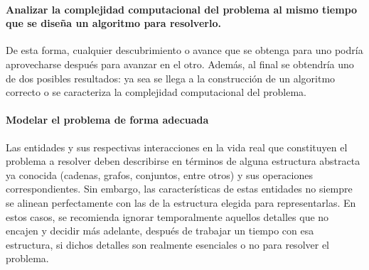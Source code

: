 \paragraph*{Analizar la complejidad computacional del problema al mismo tiempo que se diseña un algoritmo para resolverlo.}{
  De esta forma, cualquier descubrimiento o avance que se obtenga para uno podría aprovecharse después para avanzar en el otro.
  Además, al final se obtendría uno de dos posibles resultados: ya sea se llega a la construcción de un algoritmo correcto o se caracteriza la complejidad computacional del problema.
}

\paragraph*{Modelar el problema de forma adecuada}{
  Las entidades y sus respectivas interacciones en la vida real que constituyen el problema a resolver deben describirse en términos de alguna estructura abstracta ya conocida (cadenas, grafos, conjuntos, entre otros) y sus operaciones correspondientes.
  Sin embargo, las características de estas entidades no siempre se alinean perfectamente con las de la estructura elegida para representarlas.
  En estos casos, se recomienda ignorar temporalmente aquellos detalles que no encajen y decidir más adelante, después de trabajar un tiempo con esa estructura, si dichos detalles son realmente esenciales o no para resolver el problema.
}

